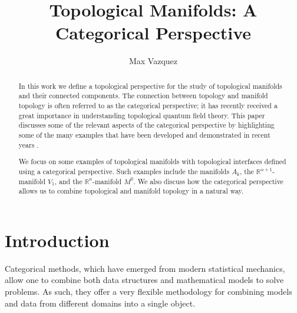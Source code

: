 \documentclass[a4paper,reqno,oneside]{article}
\begin{document}
\title{Topological Manifolds: A Categorical Perspective}
\author{Max Vazquez}
\maketitle


\begin{abstract}
    In this work we define a topological perspective for the study of topological manifolds and their connected components. The connection between topology and manifold topology is often referred to as the categorical perspective; it has recently received a great importance in understanding topological quantum field theory. 
    This paper discusses some of the relevant aspects of the categorical perspective by highlighting some of the many examples that have been developed and demonstrated in recent years \cite{AbelianManifoldTheory, TopologicalModuliFunctions, TopologicalQuantumFieldTheories}. 

    We focus on some examples of topological manifolds with topological interfaces defined using a categorical perspective. Such examples include the manifolds $A_k$, the $\mathbb{R}^{n+1}$-manifold $V_1$, and the $\mathbb{R}^n$-manifold $M^0$. 
    We also discuss how the categorical perspective allows us to combine topological and manifold topology in a natural way. 
\end{abstract}

\section{Introduction}

Categorical methods, which have emerged from modern statistical mechanics, allow one to combine both data structures and mathematical models to solve problems. As such, they offer a very flexible methodology for combining models and data from different domains into a single object.
\end{document}
